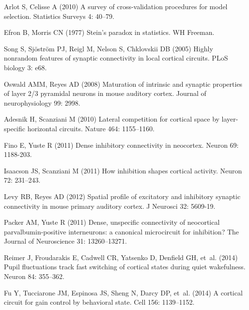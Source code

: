 \begin{thebibliography}{100}
Arlot S, Celisse A (2010) A survey of cross-validation procedures for model
  selection.
\newblock Statistics Surveys 4: 40--79.

Efron B, Morris CN (1977) Stein's paradox in statistics.
\newblock WH Freeman.

Song S, Sj{\"o}str{\"o}m PJ, Reigl M, Nelson S, Chklovskii DB (2005) Highly
  nonrandom features of synaptic connectivity in local cortical circuits.
\newblock PLoS biology 3: e68.

Oswald AMM, Reyes AD (2008) Maturation of intrinsic and synaptic properties of
  layer 2/3 pyramidal neurons in mouse auditory cortex.
\newblock Journal of neurophysiology 99: 2998.

Adesnik H, Scanziani M (2010) Lateral competition for cortical space by
  layer-specific horizontal circuits.
\newblock Nature 464: 1155--1160.

Fino E, Yuste R (2011) Dense inhibitory connectivity in neocortex.
\newblock Neuron 69: 1188-203.

Isaacson JS, Scanziani M (2011) How inhibition shapes cortical activity.
\newblock Neuron 72: 231--243.

Levy RB, Reyes AD (2012) Spatial profile of excitatory and inhibitory synaptic
  connectivity in mouse primary auditory cortex.
\newblock J Neurosci 32: 5609-19.

Packer AM, Yuste R (2011) Dense, unspecific connectivity of neocortical
  parvalbumin-positive interneurons: a canonical microcircuit for inhibition?
\newblock The Journal of Neuroscience 31: 13260--13271.

Reimer J, Froudarakis E, Cadwell CR, Yatsenko D, Denfield GH, et~al. (2014)
  Pupil fluctuations track fast switching of cortical states during quiet
  wakefulness.
\newblock Neuron 84: 355--362.

Fu Y, Tucciarone JM, Espinosa JS, Sheng N, Darcy DP, et~al. (2014) A cortical
  circuit for gain control by behavioral state.
\newblock Cell 156: 1139--1152.


\end{thebibliography}
